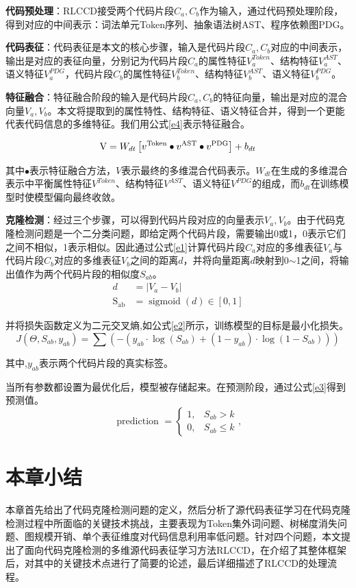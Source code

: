 \textbf{代码预处理}：RLCCD接受两个代码片段$C_{a},C_{b}$作为输入，通过代码预处理阶段，得到对应的中间表示：词法单元Token序列、抽象语法树AST、程序依赖图PDG。

\textbf{代码表征}：代码表征是本文的核心步骤，输入是代码片段$C_{a},C_{b}$对应的中间表示，输出是对应的表征向量，分别记为代码片段$C_{a}$的属性特征$V_{a}^{Token}$、结构特征$V_{a}^{AST}$、语义特征$V_{a}^{PDG}$，代码片段$C_{b}$的属性特征$V_{b}^{Token}$、结构特征$V_{b}^{AST}$、语义特征$V_{b}^{PDG}$。

\textbf{特征融合}：特征融合阶段的输入是代码片段$C_{a},C_{b}$的特征向量，输出是对应的混合向量$V_{a},V_{b}$。本文将提取到的属性特性、结构特征、语义特征合并，得到一个更能代表代码信息的多维特征。我们用公式\ref{e4}表示特征融合。

\begin{equation}\label{e4}
    \setlength{\abovedisplayskip}{1pt}
    \mathrm{V}=W_{dt}\left[v^{\text{Token}} \bullet v^{\text{AST}} \bullet v^{\text{PDG}}\right]+b_{dt}
\end{equation}

其中$\bullet$表示特征融合方法，$V$表示最终的多维混合代码表示。$W_{dt}$在生成的多维混合表示中平衡属性特征$V^{Token}$、结构特征$V^{AST}$、语义特征$V^{PDG}$的组成，而$b_{dt}$在训练模型时使模型偏向最终收敛。

\textbf{克隆检测}：经过三个步骤，可以得到代码片段对应的向量表示$V_{a},V_{b}$。由于代码克隆检测问题是一个二分类问题，即给定两个代码片段，需要输出0或1，0表示它们之间不相似，1表示相似。因此通过公式\ref{e1}计算代码片段$C_{a}$对应的多维表征$V_{a}$与代码片段$C_{b}$对应的多维表征$V_{b}$之间的距离$d$，并将向量距离$d$映射到0$\sim$1之间，将输出值作为两个代码片段的相似度$S_{ab}$。
\begin{equation}\label{e1}
    \begin{split}
    d &= \left|V_{a}-V_{b}\right| \\
    \mathrm{S_{ab}} &=\operatorname{sigmoid}\left(d\right) \in[0,1]
    \end{split}
\end{equation}

并将损失函数定义为二元交叉熵,如公式\ref{e2}所示，训练模型的目标是最小化损失。
\begin{equation}\label{e2}
    J(\Theta, S_{ab}, y_{ab})=\sum(-(y_{ab} \cdot \log (S_{ab})+(1-y_{ab}) \cdot \log (1-S_{ab})))
\end{equation}

其中,$y_{ab}$表示两个代码片段的真实标签。

当所有参数都设置为最优化后，模型被存储起来。在预测阶段，通过公式\ref{e3}得到预测值。
\begin{equation}\label{e3}
    \text { prediction }=\left\{\begin{array}{ll}
        1, & S_{ab}>k \\
        0, & S_{ab} \leq k
        \end{array},\right.
\end{equation}

\section{本章小结}
\label{sec:Summary2}
本章首先给出了代码克隆检测问题的定义，然后分析了源代码表征学习在代码克隆检测过程中所面临的关键技术挑战，主要表现为Token集外词问题、树梯度消失问题、图规模开销、单个表征维度对代码信息利用率低问题。针对四个问题，本文提出了面向代码克隆检测的多维源代码表征学习方法RLCCD，在介绍了其整体框架后，对其中的关键技术点进行了简要的论述，最后详细描述了RLCCD的处理流程。
